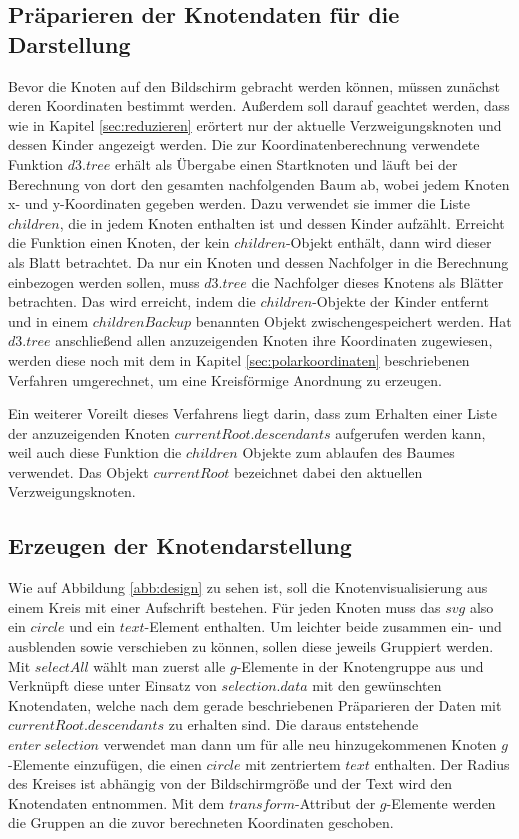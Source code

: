 \subsection{Präparieren der Knotendaten für die Darstellung}\label{sec:prep}
Bevor die Knoten auf den Bildschirm gebracht werden können, müssen zunächst deren Koordinaten bestimmt werden. Außerdem soll darauf geachtet werden, dass wie in Kapitel \ref{sec:reduzieren} erörtert nur der aktuelle Verzweigungsknoten und dessen Kinder angezeigt werden. Die zur Koordinatenberechnung verwendete Funktion $d3.tree$ erhält als Übergabe einen Startknoten und läuft bei der Berechnung von dort den gesamten nachfolgenden Baum ab, wobei jedem Knoten x- und y-Koordinaten gegeben werden. Dazu verwendet sie immer die Liste $children$, die in jedem Knoten enthalten ist und dessen Kinder aufzählt. Erreicht die Funktion einen Knoten, der kein $children$-Objekt enthält, dann wird dieser als Blatt betrachtet. Da nur ein Knoten und dessen Nachfolger in die Berechnung einbezogen werden sollen, muss $d3.tree$ die Nachfolger dieses Knotens als Blätter betrachten. Das wird erreicht, indem die $children$-Objekte der Kinder entfernt und in einem $childrenBackup$ benannten Objekt zwischengespeichert werden. Hat $d3.tree$ anschließend allen anzuzeigenden Knoten ihre Koordinaten zugewiesen, werden diese noch mit dem in Kapitel \ref{sec:polarkoordinaten} beschriebenen Verfahren umgerechnet, um eine Kreisförmige Anordnung zu erzeugen.

Ein weiterer Voreilt dieses Verfahrens liegt darin, dass zum Erhalten einer Liste der anzuzeigenden Knoten $currentRoot.descendants$ aufgerufen werden kann, weil auch diese Funktion die $children$ Objekte zum ablaufen des Baumes verwendet. Das Objekt $currentRoot$ bezeichnet dabei den aktuellen Verzweigungsknoten.

\subsection{Erzeugen der Knotendarstellung}\label{sec:knoten}

Wie auf Abbildung \ref{abb:design} zu sehen ist, soll die Knotenvisualisierung aus einem Kreis mit einer Aufschrift bestehen. Für jeden Knoten muss das $svg$ also ein $circle$ und ein $text$-Element enthalten. Um leichter beide zusammen ein- und ausblenden sowie verschieben zu können, sollen diese jeweils Gruppiert werden. Mit $selectAll$ wählt man zuerst alle $g$-Elemente in der Knotengruppe aus und Verknüpft diese unter Einsatz von $selection.data$ mit den gewünschten Knotendaten, welche nach dem gerade beschriebenen Präparieren der Daten mit $currentRoot.descendants$ zu erhalten sind. Die daraus entstehende $enter\ selection$ verwendet man dann um für alle neu hinzugekommenen Knoten $g$-Elemente einzufügen, die einen $circle$ mit zentriertem $text$ enthalten. Der Radius des Kreises ist abhängig von der Bildschirmgröße und der Text wird den Knotendaten entnommen. Mit dem $transform$-Attribut der $g$-Elemente werden die Gruppen an die zuvor berechneten Koordinaten geschoben.

